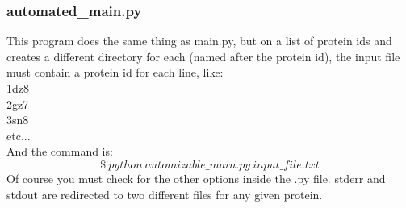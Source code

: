 		\subsubsection{automated\_main.py}
		
			This program does the same thing as main.py, but on a list of protein ids and creates a different directory for each (named after the protein id), the input file must contain a protein id for each line, like:\\
			1dz8\\
			2gz7\\
			3sn8\\
			etc...\\
			$ $\\
			And the command is:
			\[
			\$\ python\ automizable\_main.py\ input\_file.txt
			\]
			Of course you must check for the other options inside the .py file. stderr and stdout are redirected to two different files for any given protein.
				
